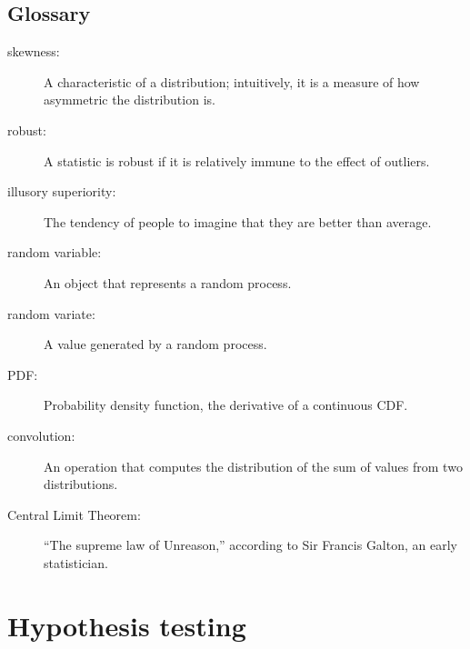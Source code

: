 \documentclass[12pt]{book}
\begin{document}
\section{Glossary}

\begin{description}

\item[skewness:] A characteristic of a distribution; intuitively, it
is a measure of how asymmetric the distribution is.

\item[robust:] A statistic is robust if it is relatively immune to the
  effect of outliers.

\item[illusory superiority:] The tendency of people to imagine that
they are better than average.

\item[random variable:] An object that represents a random process.

\item[random variate:] A value generated by a random process.

\item[PDF:] Probability density function, the derivative of a continuous CDF.

\item[convolution:] An operation that computes the distribution of the
sum of values from two distributions. 



\item[Central Limit Theorem:] ``The supreme law of Unreason,'' according
to Sir Francis Galton, an early statistician.

\end{description}


\chapter{Hypothesis testing}
\label{testing}
\end{document}
